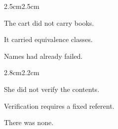 \begin{center}

\medskip


\medskip

\end{center}

\vspace{3em}

\begin{adjustwidth}{2.5cm}{2.5cm}

The cart did not carry books.

\medskip

It carried equivalence classes.

\vspace{2em}

Names had already failed.

\vspace{3em}

\end{adjustwidth}

\begin{center}

\smallskip


\smallskip


\smallskip

\end{center}

\vspace{3em}

\begin{adjustwidth}{2.8cm}{2.2cm}

She did not verify the contents.

\medskip

Verification requires a fixed referent.

\medskip

There was none.

\vspace{3em}


\vspace{3em}

\end{adjustwidth}

